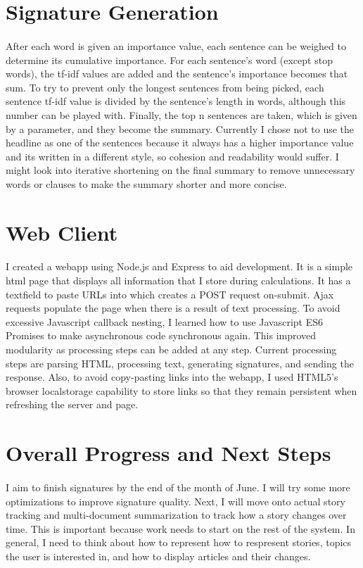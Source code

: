 \documentclass[11pt]{article}
\begin{document}
\section{Signature Generation}
\paragraph{}
After each word is given an importance value, each sentence can be weighed to determine its cumulative importance. For each sentence's word (except stop words), the tf-idf values are added and the sentence's importance becomes that sum. To try to prevent only the longest sentences from being picked, each sentence tf-idf value is divided by the sentence's length in words, although this number can be played with. Finally, the top n sentences are taken, which is given by a parameter, and they become the summary. Currently I chose not to use the headline as one of the sentences because it always has a higher importance value and its written in a different style, so cohesion and readability would suffer. I might look into iterative shortening on the final summary to remove unnecessary words or clauses to make the summary shorter and more concise.

\section{Web Client}
\paragraph{}
I created a webapp using Node.js and Express to aid development. It is a simple html page that displays all information that I store during calculations. It has a textfield to paste URLs into which creates a POST request on-submit. Ajax requests populate the page when there is a result of text processing. To avoid excessive Javascript callback nesting, I learned how to use Javascript ES6 Promises to make asynchronous code synchronous again. This improved modularity as processing steps can be added at any step. Current processing steps are parsing HTML, processing text, generating signatures, and sending the response. Also, to avoid copy-pasting links into the webapp, I used HTML5's browser localstorage capability to store links so that they remain persistent when refreshing the server and page. 
\section{Overall Progress and Next Steps}
\paragraph{}
I aim to finish signatures by the end of the month of June. I will try some more optimizations to improve signature quality. Next, I will move onto actual story tracking and multi-document summarization to track how a story changes over time. This is important because work needs to start on the rest of the system. In general, I need to think about how to represent how to respresent stories, topics the user is interested in, and how to display articles and their changes.
\end{document}
